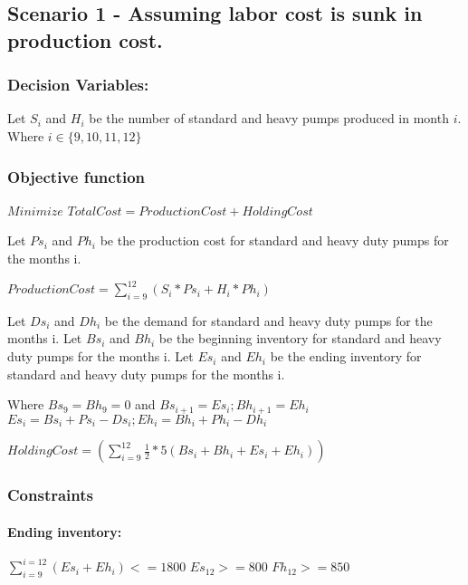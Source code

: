 \documentclass[]{article}
\let\oldparagraph\paragraph
\renewcommand{\paragraph}[1]{\oldparagraph{#1}\mbox{}}
\begin{document}
\subsection{Scenario 1 - Assuming labor cost is sunk in production
cost.}\label{scenario-1---assuming-labor-cost-is-sunk-in-production-cost.}

\subsubsection{Decision Variables:}\label{decision-variables-3}

Let \(S_{i}\) and \(H_{i}\) be the number of standard and heavy pumps
produced in month \(i\). Where \(i \in \{9,10,11,12\}\)

\subsubsection{Objective function}\label{objective-function-3}

\(Minimize\) \(Total Cost = Production Cost + Holding Cost\)

Let \(Ps_{i}\) and \(Ph_{i}\) be the production cost for standard and
heavy duty pumps for the months i.

\(Production Cost = \sum_{i=9}^{12}(S_{i}*Ps_{i} + H_{i}*Ph_{i})\)

Let \(Ds_{i}\) and \(Dh_{i}\) be the demand for standard and heavy duty
pumps for the months i. Let \(Bs_{i}\) and \(Bh_{i}\) be the beginning
inventory for standard and heavy duty pumps for the months i. Let
\(Es_{i}\) and \(Eh_{i}\) be the ending inventory for standard and heavy
duty pumps for the months i.

Where \(Bs_{9} = Bh_{9} = 0\) and
\(Bs_{i+1} = Es_{i} ; Bh_{i+1} = Eh_{i}\)
\(Es_{i} = Bs_{i} + Ps_{i} - Ds_{i} ; Eh_{i} = Bh_{i} + Ph_{i} - Dh_{i}\)

\(Holding Cost = (\sum_{i=9}^{12}\frac {1}{2}*5(Bs_{i} + Bh_{i} + Es_{i} + Eh_{i}))\)

\subsubsection{Constraints}\label{constraints-3}

\paragraph{Ending inventory:}\label{ending-inventory}

\(\sum_{i=9}^{i=12}(Es_{i} + Eh_{i}) <= 1800\) \(Es_{12} >= 800\)
\(Fh_{12} >= 850\)
\end{document}

